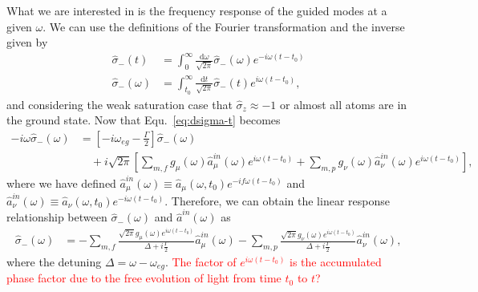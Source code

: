 \documentclass[preprint,aps,pra,onecolumn]{revtex4-1} %
\begin{document}
What we are interested in is the frequency response of the guided modes at a given $\omega$. We can use the definitions of the Fourier transformation and the inverse given by 
\begin{align}
\hat{\sigma}_-(t) &= \int_0^{\infty} \frac{\mathrm{d}\omega}{\sqrt{2\pi}} \hat{\sigma}_-(\omega) e^{-i\omega (t-t_0)}\\
\hat{\sigma}_-(\omega) &= \int_{t_0}^{\infty} \frac{\mathrm{d}t}{\sqrt{2\pi}} \hat{\sigma}_-(t) e^{i\omega (t-t_0)},
\end{align}
and considering the weak saturation case that $\hat{\sigma}_z\approx -1$ or almost all atoms are in the ground state. Now that Equ.~\eqref{eq:dsigma-t} becomes
\begin{align}
-i\omega \hat{\sigma}_-(\omega) &= \left[-i\omega_{eg}-\frac{\Gamma}{2} \right]\hat{\sigma}_-(\omega) 
\nonumber\\
&\quad +i\sqrt{2\pi}\left[ \sum_{m,f} g_\mu(\omega) \hat{a}^{in}_\mu(\omega)e^{i\omega(t-t_0)}+\sum_{m,p} g_\nu(\omega) \hat{a}^{in}_\nu(\omega)e^{i\omega(t-t_0)}\right],
\end{align}
where we have defined $\hat{a}^{in}_\mu(\omega)\equiv \hat{a}_\mu(\omega, t_0)e^{-if\omega(t-t_0)}$ and $\hat{a}^{in}_\nu(\omega)\equiv \hat{a}_\nu(\omega, t_0)e^{-i\omega(t-t_0)}$. 
Therefore, we can obtain the linear response relationship between $\hat{\sigma}_-(\omega)$ and $\hat{a}^{in}(\omega)$ as
\begin{align}\label{eq:sigma-ain}
\hat{\sigma}_-(\omega) &= -\sum_{m,f} 
\frac{\sqrt{2\pi}g_\mu(\omega)e^{i\omega(t-t_0)}}{\Delta+i\frac{\Gamma}{2}}\hat{a}^{in}_\mu(\omega)-\sum_{m,p}
 \frac{\sqrt{2\pi}g_\nu(\omega)e^{i\omega(t-t_0)}}{\Delta+i\frac{\Gamma}{2}}\hat{a}^{in}_\nu(\omega),
\end{align}
where the detuning $\Delta=\omega-\omega_{eg}$. \textcolor{red}{The factor of $e^{i\omega(t-t_0)}$ is the accumulated phase factor due to the free evolution of light from time $t_0$ to $t$?}
\end{document}
